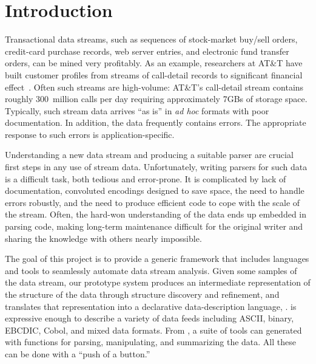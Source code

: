 \documentclass{article}
\begin{document}
\section{Introduction}
\label{intro}
Transactional data streams, such as sequences of stock-market buy/sell orders,
credit-card purchase records, web server entries, and electronic fund
transfer orders, can be mined very profitably.  As an example,
researchers at AT\&T have built customer profiles from streams of
call-detail records to significant financial effect~\cite{kdd99}.   
Often such streams are high-volume: AT\&T's call-detail stream contains
roughly 300~million calls per day requiring approximately 7GBs of
storage space.  Typically, such stream data arrives ``as is'' in
\textit{ad hoc} formats with poor documentation.  In addition, the
data frequently contains errors.  The appropriate response to such
errors is application-specific. 

Understanding a new data stream and producing a suitable parser are
crucial first steps in any use of stream data.  Unfortunately, writing
parsers for such data is a difficult task, both tedious and
error-prone. It is complicated by lack of documentation, convoluted
encodings designed to save space, the need to handle errors
robustly, and the need to produce efficient code to cope with the
scale of the stream.  Often, the hard-won understanding of the data
ends up embedded in parsing code, making long-term maintenance
difficult for the original writer and sharing the knowledge with
others nearly impossible.

The goal of this project is to provide a generic framework that includes
languages and tools to seamlessly automate data stream analysis. 
Given some samples of the data stream, our prototype system produces 
an intermediate
representation of the structure of the data through structure discovery
and refinement, and translates that representation into a
declarative data-description language, \padsc{}. \padsc{} is 
expressive enough to describe a variety of data feeds 
including ASCII, binary, EBCDIC, Cobol, and mixed data formats.  
From \padsc{}, a suite of tools can generated with functions for 
parsing, manipulating, and summarizing the data. All these can be 
done with a ``push of a button.''   
\end{document}

